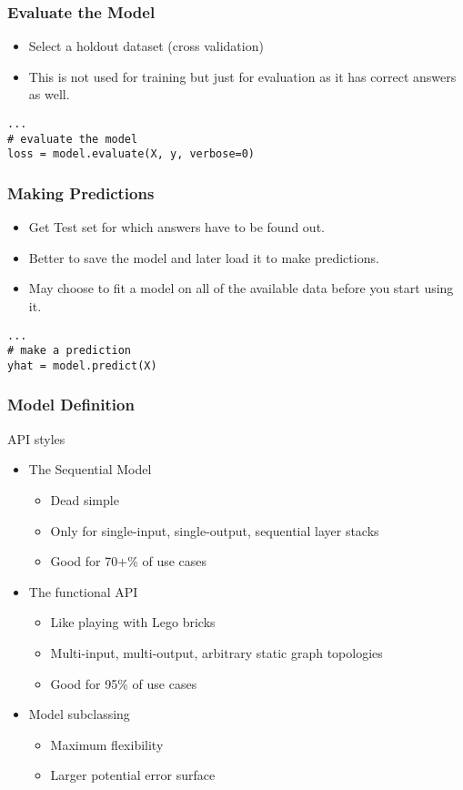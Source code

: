 \begin{frame}[fragile] \frametitle{Evaluate the Model}

\begin{itemize}
\item Select a holdout dataset (cross validation)
\item This is not used for training but just for evaluation as it has correct answers as well.
\end{itemize}

\begin{lstlisting}
...
# evaluate the model
loss = model.evaluate(X, y, verbose=0)
\end{lstlisting}
\end{frame}

\begin{frame}[fragile] \frametitle{Making Predictions}

\begin{itemize}
\item Get Test set for which answers have to be found out.
\item Better to save the model and later load it to make predictions. 
\item May choose to fit a model on all of the available data before you start using it.
\end{itemize}

\begin{lstlisting}
...
# make a prediction
yhat = model.predict(X)
\end{lstlisting}
\end{frame}
\begin{frame}[fragile] \frametitle{Model Definition}
API styles
\begin{itemize}
\item   The Sequential Model
\begin{itemize}
\item   Dead simple
\item   Only for single-input, single-output, sequential layer stacks
\item   Good for 70+\% of use cases
\end{itemize}
\item   The functional API
\begin{itemize}
\item   Like playing with Lego bricks
\item    Multi-input, multi-output, arbitrary static graph topologies
\item   Good for 95\% of use cases
\end{itemize}
\item   Model subclassing
\begin{itemize}
\item    Maximum flexibility
\item    Larger potential error surface
\end{itemize}
\end{itemize}
\end{frame}

